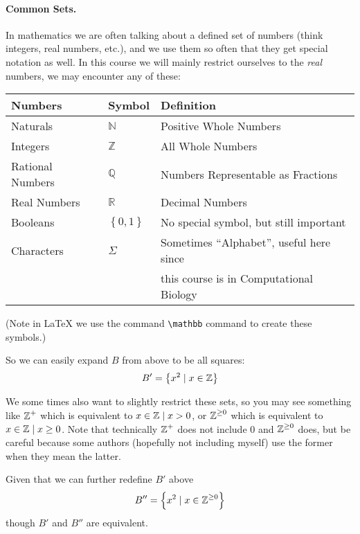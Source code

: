 \documentclass[11pt, oneside]{article}   	%
\begin{document}
\paragraph{Common Sets.}
In mathematics we are often talking about a defined set of numbers (think integers, real numbers, etc.), 
and we use them so often that they get special notation as well. 
In this course we will mainly restrict ourselves to the \textit{real} numbers, we may encounter any of these:
\begin{center}
\begin{tabular}{l|l||l}
\hline
Numbers			& Symbol			& Definition\\
\hline
\hline
Naturals 			& $\mathbb{N}$	& Positive Whole Numbers\\
Integers 			& $\mathbb{Z}$		& All Whole Numbers\\
Rational Numbers	& $\mathbb{Q}$	& Numbers Representable as Fractions\\
Real Numbers		& $\mathbb{R}$	& Decimal Numbers\\
Booleans			& $\left\{0,1\right\}$	& No special symbol, but still important\\
Characters		& $\Sigma$		& Sometimes ``Alphabet''\footnotemark, useful here since\\
				&				& \hspace{3em} this course is in Computational Biology\\
\hline
\end{tabular}
\end{center}
(Note in \LaTeX{} we use the command \texttt{\textbackslash{}mathbb} command to create these symbols.)

So we can easily expand $B$ from above to be all squares:
\[
B' = \left\{x^2 \mid x \in \operatorname{\mathbb{Z}} \right\}
\]

We some times also want to slightly restrict these sets, so you may see something like $\operatorname{\mathbb{Z}}^+$ which is equivalent to ${x \in \operatorname{\mathbb{Z}} \mid x > 0}$, 
or $\operatorname{\mathbb{Z}}^{\ge0}$ which is equivalent to ${x \in \operatorname{\mathbb{Z}} \mid x \ge 0}$.
Note that technically $\operatorname{\mathbb{Z}}^+$ does not include 0 and $\operatorname{\mathbb{Z}}^{\ge0}$ does, 
but be careful because some authors (hopefully not including myself) use the former when they mean the latter. 

Given that we can further redefine $B'$ above 
\[
B'' = \left\{x^2 \mid x \in \operatorname{\mathbb{Z}}^{\ge0} \right\}
\]
 though $B'$ and $B''$ are equivalent. 
 
\end{document}
